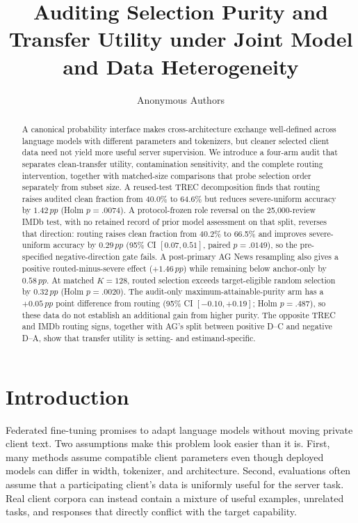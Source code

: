 \documentclass[letterpaper]{article}
\title{Auditing Selection Purity and Transfer Utility under Joint Model and
Data Heterogeneity}
\author{Anonymous Authors}
\newcommand{\pp}{\,pp}
\begin{document}
\maketitle
\setlength{\emergencystretch}{1em}

\begin{abstract}
A canonical probability interface makes cross-architecture exchange
well-defined across language models with different parameters and tokenizers,
but cleaner selected client data need not yield more useful server
supervision.  We introduce a four-arm audit that separates clean-transfer
utility, contamination sensitivity, and the complete routing intervention,
together with matched-size comparisons that probe selection order separately
from subset size.  A reused-test TREC decomposition finds that routing raises
audited clean fraction from 40.0\% to 64.6\% but reduces severe-uniform
accuracy by \(1.42\pp\) (Holm \(p=.0074\)).  A protocol-frozen role reversal
on the 25,000-review IMDb test, with no retained record of prior model
assessment on that split, reverses that direction: routing raises clean
fraction from 40.2\% to 66.5\% and improves severe-uniform accuracy by
\(0.29\pp\) (95\% CI \([0.07,0.51]\), paired \(p=.0149\)), so the pre-specified
negative-direction gate fails.  A post-primary AG News resampling
also gives a positive routed-minus-severe effect (\(+1.46\pp\)) while remaining
below anchor-only by \(0.58\pp\).  At matched \(K=128\), routed
selection exceeds target-eligible random selection by \(0.32\pp\) (Holm
\(p=.0020\)).  The audit-only maximum-attainable-purity arm has a \(+0.05\pp\)
point difference from routing (95\% CI \([-0.10,+0.19]\); Holm \(p=.487\)), so
these data do not establish an additional gain from higher purity.  The
opposite TREC and IMDb routing signs, together with AG's split between
positive D--C and negative D--A, show that transfer utility is setting- and
estimand-specific.
\end{abstract}

\section{Introduction}
Federated fine-tuning promises to adapt language models without moving private
client text.  Two assumptions make this problem look easier than it is.
First, many methods assume compatible client parameters even though deployed
models can differ in width, tokenizer, and architecture.  Second, evaluations
often assume that a participating client's data is uniformly useful for the
server task.  Real client corpora can instead contain a mixture of useful
examples, unrelated tasks, and responses that directly conflict with the
target capability.
\end{document}
